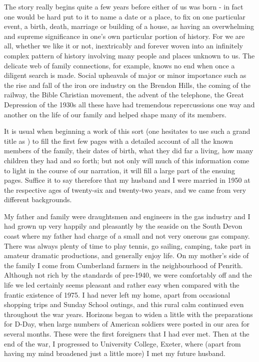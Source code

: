 
The story really begins quite a few years before either of us was born - in fact one would be hard put to it to name a date or a place, to fix on one particular event, a birth, death, marriage or building of a house, as having an overwhelming and supreme significance in one's own particular portion of history. For we are all, whether we like it or not, inextricably and forever woven into an infinitely complex pattern of history involving many people and places unknown to us. The delicate web of family connections, for example, knows no end when once a diligent search is made. Social upheavals of major or minor importance such as the rise and fall of the iron ore industry on the Brendon Hills, the coming of the railway, the Bible Christian movement, the advent of the telephone, the Great Depression of the 1930s all these have had tremendous repercussions one way and another on the life of our family and helped shape many of its members.

It is usual when beginning a work of this sort (one hesitates to use such a grand title as ) to fill the first few pages with a detailed account of all the known members of the family, their dates of birth, what they did far a living, how many children they had and so forth; but not only will much of this information come to light in the course of our narration, it will fill a large part of the ensuing pages. Suffice it to say therefore that my husband and I were married in 1950 at the respective ages of twenty-six and twenty-two years, and we came from very different backgrounds.

My father and family were draughtsmen and engineers in the gas industry and I had grown up very happily and pleasantly by the seaside on the South Devon coast where my father had charge of a small and not very onerous gas company. There was always plenty of time to play tennis, go sailing, camping, take part in amateur dramatic productions, and generally enjoy life. On my mother's side of the family I come from Cumberland farmers in the neighbourhood of Penrith. Although not rich by the standards of pre-1940, we were comfortably off and the life we led certainly seems pleasant and rather easy when compared with the frantic existence of 1975. I had never left my home, apart from occasional shopping trips and Sunday School outings, and this rural calm continued even throughout the war years. Horizons began to widen a little with the preparations for D-Day, when large numbers of American soldiers were posted in our area for several months. These were the first foreigners that I had ever met.  Then at the end of the war, I progressed to University College, Exeter, where (apart from having my mind broadened just a little more) I met my future husband.

